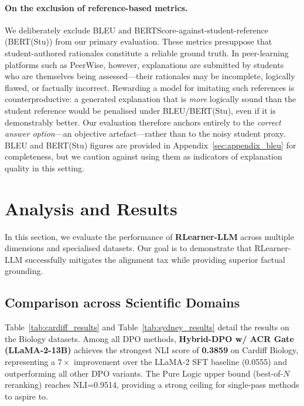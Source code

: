 \paragraph{On the exclusion of reference-based metrics.}
We deliberately exclude BLEU and BERTScore-against-student-reference (BERT(Stu)) from our primary evaluation. These metrics presuppose that student-authored rationales constitute a reliable ground truth. In peer-learning platforms such as PeerWise, however, explanations are submitted by students who are themselves being assessed---their rationales may be incomplete, logically flawed, or factually incorrect. Rewarding a model for imitating such references is counterproductive: a generated explanation that is \emph{more} logically sound than the student reference would be penalised under BLEU/BERT(Stu), even if it is demonstrably better. Our evaluation therefore anchors entirely to the \emph{correct answer option}---an objective artefact---rather than to the noisy student proxy. BLEU and BERT(Stu) figures are provided in Appendix~\ref{sec:appendix_bleu} for completeness, but we caution against using them as indicators of explanation quality in this setting.

\section{Analysis and Results}

In this section, we evaluate the performance of \textbf{RLearner-LLM} across multiple dimensions and specialised datasets. Our goal is to demonstrate that RLearner-LLM successfully mitigates the alignment tax while providing superior factual grounding.

\subsection{Comparison across Scientific Domains}

Table~\ref{tab:cardiff_results} and Table~\ref{tab:sydney_results} detail the results on the Biology datasets. Among all DPO methods, \textbf{Hybrid-DPO w/ ACR Gate (LLaMA-2-13B)} achieves the strongest NLI score of \textbf{0.3859} on Cardiff Biology, representing a $7\times$ improvement over the LLaMA-2 SFT baseline (0.0555) and outperforming all other DPO variants. The Pure Logic upper bound (best-of-$N$ reranking) reaches NLI=0.9514, providing a strong ceiling for single-pass methods to aspire to.

